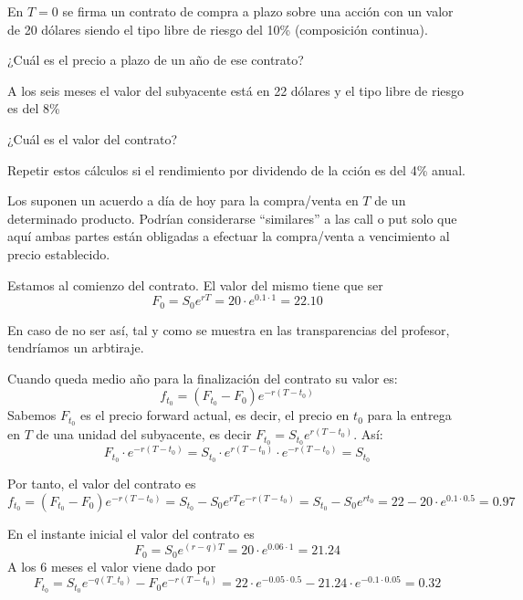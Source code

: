 \begin{problem}[1]
En $T=0$ se firma un contrato de compra a plazo sobre una acción con un valor de 20 dólares siendo el tipo libre de riesgo del 10\% (composición continua).

\ppart ¿Cuál es el precio a plazo de un año de ese contrato?

A los seis meses el valor del subyacente está en 22 dólares y el tipo libre de riesgo es del 8\%

\ppart ¿Cuál es el valor del contrato?

\ppart Repetir estos cálculos si el rendimiento por dividendo de la cción es del 4\% anual.

\solution
{}

Los  suponen un acuerdo a día de hoy para la compra/venta en $T$ de un determinado producto. Podrían considerarse ``similares'' a las call o put solo que aquí ambas partes están obligadas a efectuar la compra/venta a vencimiento al precio establecido.

\spart
Estamos al comienzo del contrato. El valor del mismo tiene que ser
\[F_0 = S_0e^{rT} = 20 \cdot e^{0.1\cdot 1} = 22.10\]

En caso de no ser así, tal y como se muestra en las transparencias del profesor, tendríamos un arbtiraje.

\spart Cuando queda medio año para la finalización del contrato su valor es:
\[f_{t_0} = (F_{t_0}-F_0)e^{-r(T-t_0)}\]
Sabemos $F_{t_0}$ es el precio forward actual, es decir, el precio en $t_0$ para la entrega en $T$ de una unidad del subyacente, es decir $F_{t_0} = S_{t_0}e^{r(T-t_0)}$. Así:
\[F_{t_0} \cdot e^{-r(T-t_0)} = S_{t_0}\cdot e^{r(T-t_0)}  \cdot e^{-r(T-t_0)} =S_{t_0}\]

Por tanto, el valor del contrato es
\[f_{t_0} = (F_{t_0}-F_0)e^{-r(T-t_0)} = S_{t_0}-S_0e^{rT}e^{-r(T-t_0)} = S_{t_0}-S_0e^{rt_0} = 22 - 20\cdot e^{0.1\cdot 0.5} = 0.97 \]

\spart
En el instante inicial el valor del contrato es
\[F_0 = S_0e^{(r-q)T} = 20 \cdot e^{0.06\cdot 1} = 21.24\]
A los 6 meses el valor viene dado por
\[F_{t_0} = S_{t_0}e^{-q(T_-t_0)}-F_0e^{-r(T-t_0)} = 22\cdot e^{-0.05\cdot 0.5} - 21.24\cdot e^{-0.1\cdot 0.05} = 0.32\]

\end{problem}

